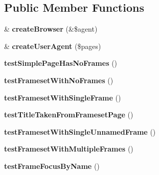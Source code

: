 \subsection*{Public Member Functions}
\begin{DoxyCompactItemize}
\item 
\hypertarget{class_test_of_browser_frames_a9ec2178f9eea8d5d776467cc37706a31}{
\& {\bfseries createBrowser} (\&\$agent)}
\label{class_test_of_browser_frames_a9ec2178f9eea8d5d776467cc37706a31}

\item 
\hypertarget{class_test_of_browser_frames_a0433d02934d21c29ce80ecc0b7e326c9}{
\& {\bfseries createUserAgent} (\$pages)}
\label{class_test_of_browser_frames_a0433d02934d21c29ce80ecc0b7e326c9}

\item 
\hypertarget{class_test_of_browser_frames_af10785c89870c55827b4dcb12f4c3011}{
{\bfseries testSimplePageHasNoFrames} ()}
\label{class_test_of_browser_frames_af10785c89870c55827b4dcb12f4c3011}

\item 
\hypertarget{class_test_of_browser_frames_a413444263fd396be0837b306212c507c}{
{\bfseries testFramesetWithNoFrames} ()}
\label{class_test_of_browser_frames_a413444263fd396be0837b306212c507c}

\item 
\hypertarget{class_test_of_browser_frames_a48ff5ced05a96e0a914fb4e980308867}{
{\bfseries testFramesetWithSingleFrame} ()}
\label{class_test_of_browser_frames_a48ff5ced05a96e0a914fb4e980308867}

\item 
\hypertarget{class_test_of_browser_frames_a5de6a87c83396a798b0e8c4bbdf8a05f}{
{\bfseries testTitleTakenFromFramesetPage} ()}
\label{class_test_of_browser_frames_a5de6a87c83396a798b0e8c4bbdf8a05f}

\item 
\hypertarget{class_test_of_browser_frames_ab78d70832cb68faf448f727094a5e2c7}{
{\bfseries testFramesetWithSingleUnnamedFrame} ()}
\label{class_test_of_browser_frames_ab78d70832cb68faf448f727094a5e2c7}

\item 
\hypertarget{class_test_of_browser_frames_ac05faacfbdb4d5e7320b6bc86eaaaf87}{
{\bfseries testFramesetWithMultipleFrames} ()}
\label{class_test_of_browser_frames_ac05faacfbdb4d5e7320b6bc86eaaaf87}

\item 
\hypertarget{class_test_of_browser_frames_ab27db290f5ec8f89de8b4265b5f211e6}{
{\bfseries testFrameFocusByName} ()}
\label{class_test_of_browser_frames_ab27db290f5ec8f89de8b4265b5f211e6}


\end{DoxyCompactItemize}
